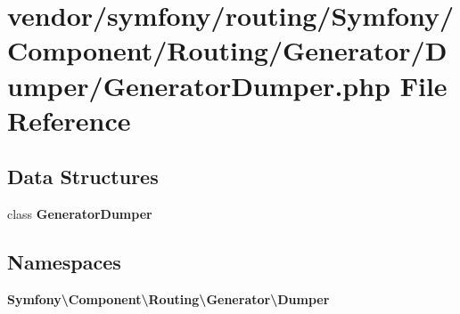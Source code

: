 \section{vendor/symfony/routing/\+Symfony/\+Component/\+Routing/\+Generator/\+Dumper/\+Generator\+Dumper.php File Reference}
\label{_generator_dumper_8php}
\subsection*{Data Structures}
\begin{DoxyCompactItemize}
\item 
class {\bf Generator\+Dumper}
\end{DoxyCompactItemize}
\subsection*{Namespaces}
\begin{DoxyCompactItemize}
\item 
 {\bf Symfony\textbackslash{}\+Component\textbackslash{}\+Routing\textbackslash{}\+Generator\textbackslash{}\+Dumper}
\end{DoxyCompactItemize}
